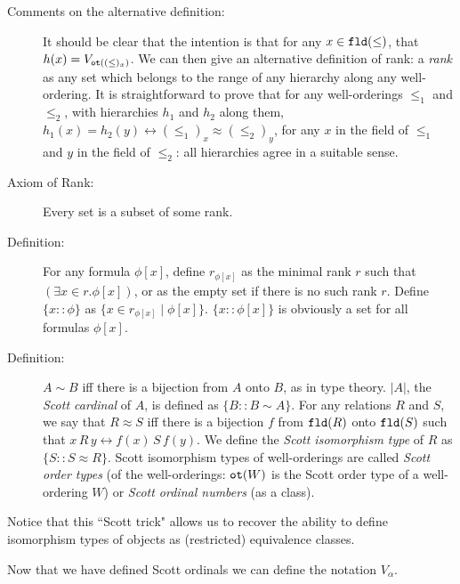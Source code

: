 \documentclass[12pt]{book}
\begin{document}
\begin{description}
\begin{enumerate}
\end{enumerate}

\item[Comments on the alternative definition:]  It should be clear that the intention is that for any $x \in {\tt fld}(\leq)$, that $h(x) = V_{{\tt ot}((\leq)_x)}$.  We can then give an alternative definition of rank:
a {\em rank\/} as any set which belongs to the range of any hierarchy along any well-ordering.  It is straightforward to prove that for any well-orderings $\leq_1$ and $\leq_2$, with hierarchies $h_1$ and $h_2$ along them, $h_1(x) = h_2(y) \leftrightarrow (\leq_1)_x \approx (\leq_2)_y$, for any $x$ in the field of $\leq_1$ and $y$ in the field of $\leq_2$: all hierarchies agree in a suitable sense.

\item[Axiom of Rank:]  Every set is a subset of some rank.


\item[Definition:] For any formula $\phi[x]$, define $r_{\phi[x]}$ as
the minimal rank $r$ such that $(\exists x \in r.\phi[x])$, or as the
empty set if there is no such rank $r$.  Define $\{x :: \phi\}$ as $\{x
\in r_{\phi[x]}\mid\phi[x]\}$.  $\{x :: \phi[x]\}$ is obviously a set for all
formulas $\phi[x]$.

\item[Definition:] $A \sim B$ iff there is a bijection from $A$ onto
$B$, as in type theory.  $|A|$, the {\em Scott cardinal\/} of $A$, is
defined as $\{B :: B \sim A\}$.  For any relations $R$ and $S$, we say
that $R \approx S$ iff there is a bijection $f$ from ${\tt fld}(R)$
onto ${\tt fld}(S)$ such that $x\, R \, y \leftrightarrow
f(x)\,S\,f(y)$.  We define the {\em Scott isomorphism type\/} of $R$
as $\{S :: S \approx R\}$.  Scott isomorphism types of well-orderings
are called {\em Scott order types\/} (of the well-orderings:
${\tt ot}(W)$ is the Scott order type of a well-ordering $W$) or {\em
Scott ordinal numbers\/} (as a class).

\end{description}

Notice that this ``Scott trick" allows us to recover the ability to define isomorphism types of objects
as (restricted) equivalence classes.

Now that we have defined Scott ordinals we can define the notation $V_{\alpha}$.
\end{document}
